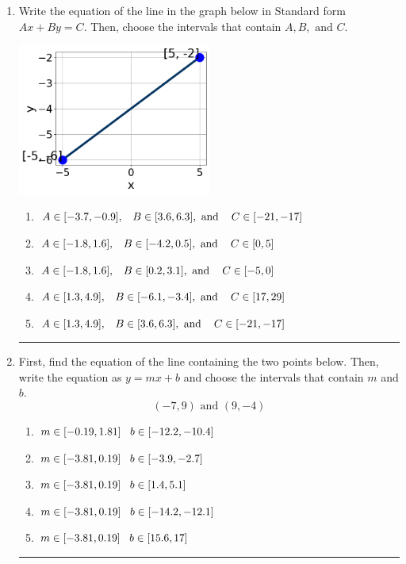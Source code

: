 \documentclass[14pt]{extbook}
\newcommand{\litem}[1]{\item#1\hspace*{-1cm}\rule{\textwidth}{0.4pt}}
\begin{document}
\begin{enumerate}
{\begin{enumerate}[label=\Alph*.]
\end{enumerate} }
\litem{
Write the equation of the line in the graph below in Standard form $Ax+By=C$. Then, choose the intervals that contain $A, B, \text{ and } C$.
\begin{center}
    \includegraphics[width=0.5\textwidth]{../Figures/linearGraphToStandardA.png}
\end{center}
\begin{enumerate}[label=\Alph*.]
\item \( A \in [-3.7, -0.9], \hspace{3mm} B \in [3.6, 6.3], \text{ and } \hspace{3mm} C \in [-21, -17] \)
\item \( A \in [-1.8, 1.6], \hspace{3mm} B \in [-4.2, 0.5], \text{ and } \hspace{3mm} C \in [0, 5] \)
\item \( A \in [-1.8, 1.6], \hspace{3mm} B \in [0.2, 3.1], \text{ and } \hspace{3mm} C \in [-5, 0] \)
\item \( A \in [1.3, 4.9], \hspace{3mm} B \in [-6.1, -3.4], \text{ and } \hspace{3mm} C \in [17, 29] \)
\item \( A \in [1.3, 4.9], \hspace{3mm} B \in [3.6, 6.3], \text{ and } \hspace{3mm} C \in [-21, -17] \)

\end{enumerate} }
\litem{
First, find the equation of the line containing the two points below. Then, write the equation as $ y=mx+b $ and choose the intervals that contain $m$ and $b$.\[ (-7, 9) \text{ and } (9, -4) \]\begin{enumerate}[label=\Alph*.]
\item \( m \in [-0.19, 1.81] \hspace*{3mm} b \in [-12.2, -10.4] \)
\item \( m \in [-3.81, 0.19] \hspace*{3mm} b \in [-3.9, -2.7] \)
\item \( m \in [-3.81, 0.19] \hspace*{3mm} b \in [1.4, 5.1] \)
\item \( m \in [-3.81, 0.19] \hspace*{3mm} b \in [-14.2, -12.1] \)
\item \( m \in [-3.81, 0.19] \hspace*{3mm} b \in [15.6, 17] \)


\end{enumerate}}
\end{enumerate}
\end{document}
